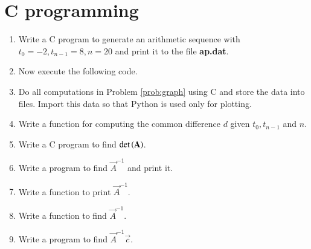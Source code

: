 \documentclass[journal,12pt,twocolumn]{IEEEtran}
\renewcommand\thesection{\arabic{section}}
\begin{document}
\section{C programming}
\begin{enumerate}[label=\thesection.\arabic*
,ref=\thesection.\theenumi]
\item Write a C program to generate an arithmetic sequence with $t_0 = -2, t_{n-1}= 8, n = 20$ and print it to 
the file \textbf{ap.dat}.
\\
\solution

\item Now execute the following code.

\item Do all computations in Problem \ref{prob:graph} using C and store the data into files.  Import this data 
so that Python is used only for plotting.
\item Write a function for computing the common difference $d$ given $t_0,t_{n-1}$ and $n$.
\\
\solution

\item Write a C program to find $\det\left(\mathbf{A}\right)$.
\\
\solution

\item Write a program to find $\vec{A}^{-1}$ and print it.
\item Write a function to print $\vec{A}^{-1}$.
\item Write a function to find $\vec{A}^{-1}$.
\item Write a program to find $\vec{A}^{-1}\vec{c}$.

\end{enumerate}
\end{document}

